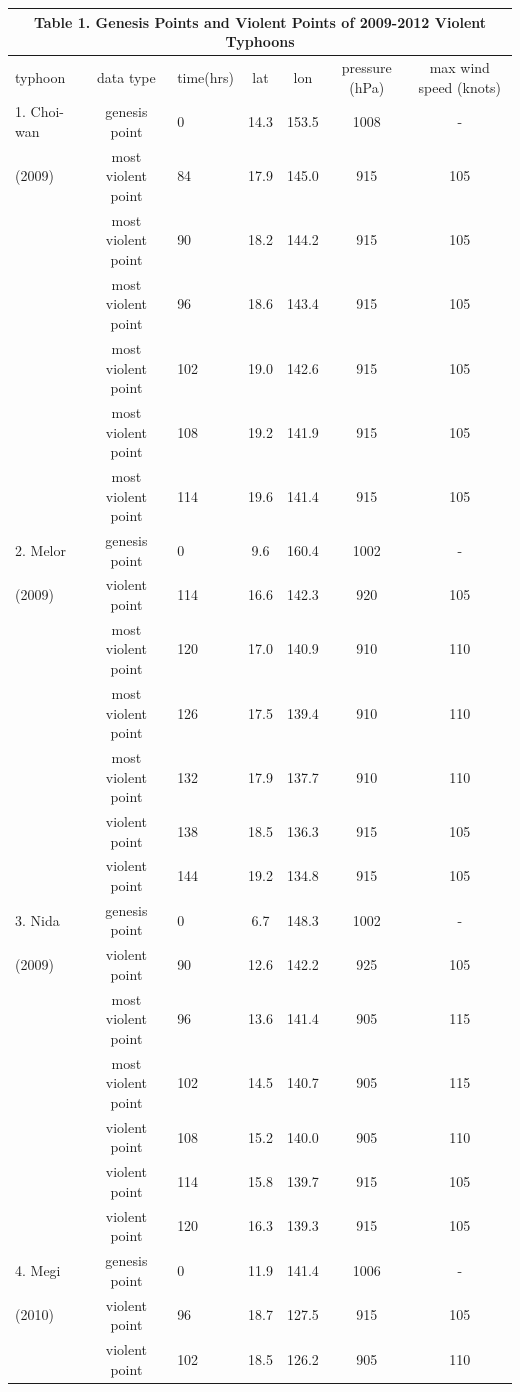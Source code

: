 \documentclass[a4paper, 12pt]{article}
\begin{document}
{\newpage
\begin{table}[h]
\tiny
\centering
   \begin{tabular}{|l|c|l|c|c|c|c|}
 \multicolumn{7}{c}{{\small Table 1. Genesis Points and Violent Points of 2009-2012 Violent Typhoons}} \\\hline
 typhoon&data type&time(hrs) & lat & lon & pressure (hPa)&max wind speed (knots)\\\hline
1. Choi-wan &genesis point&  0	&14.3	&153.5	& 1008	& -	\\
(2009)&most violent point &84&	17.9&	145.0&	915&	105	\\
&most violent point&90&	18.2&	144.2&	915&	105	\\
&most violent point&96&		18.6&	143.4&	915&	105	\\
&most violent point&102&		19.0&	142.6&	915&	105	\\
&most violent point&108&		19.2&	141.9&	915&	105	\\
&most violent point&114&19.6&141.4&915&105\\\hline
2. Melor & genesis point &0	    &9.6	&160.4	&1002&	-\\	
(2009) &violent point&114	&16.6&	142.3&	920&    105	\\	
&most violent point&120	&17.0&	140.9&	910&	110	\\	
&most violent point&126	&17.5&	139.4&	910&	110	\\	
&most violent point&132	&17.9&	137.7&	910&	110	\\	
&violent point&138	&18.5&	136.3&	915&	105	\\
&violent point&144	&19.2&	134.8&	915&	105	\\\hline
3. Nida&genesis point &0&	6.7	&148.3	&1002&	-	\\
(2009) &violent point&90	&12.6	&142.2	&925&	105	\\
&most violent point&96	&13.6	&141.4	&905&	115	\\
&most violent point&102&	14.5&	140.7&	905&	115	\\
&violent point&108&	15.2&	140.0&	905&	110	\\
&violent point&114&	15.8&	139.7&	915	&105	\\
&violent point&120&	16.3&	139.3&	915	&105	\\   \hline
4. Megi&genesis point &0	&11.9	&141.4	&1006&	-	\\
(2010) &violent point&96	&18.7	&127.5	&915	&105	\\
&violent point&102&	18.5	&126.2&	905	&110	\\

\end{tabular}
\end{table}}
\end{document}
